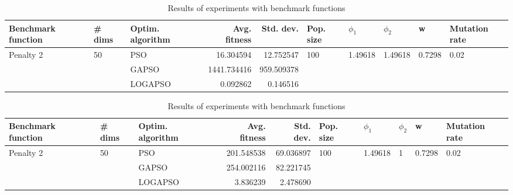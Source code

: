 \documentclass{article}
\begin{document}
\begin{table}
\centering
\caption{Results of experiments with benchmark functions}
\begin{tabular}{lllrrlllll}
\toprule
        Benchmark function &             \# dims & Optim. algorithm &  Avg. fitness &  Std. dev. &            Pop. size &               $\phi_{1}$ &               $\phi_{2}$ &                       w &         Mutation rate \\
\midrule
\multirow{3}{*}{Penalty 2} & \multirow{3}{*}{50} &              PSO &     16.304594 &  12.752547 & \multirow{3}{*}{100} & \multirow{3}{*}{1.49618} & \multirow{3}{*}{1.49618} & \multirow{3}{*}{0.7298} & \multirow{3}{*}{0.02} \\
                           &                     &            GAPSO &   1441.734416 & 959.509378 &                      &                          &                          &                         &                       \\
                           &                     &          LOGAPSO &      0.092862 &   0.146516 &                      &                          &                          &                         &                       \\
\bottomrule
\end{tabular}
\end{table}
\begin{table}
\centering
\caption{Results of experiments with benchmark functions}
\begin{tabular}{lllrrlllll}
\toprule
        Benchmark function &             \# dims & Optim. algorithm &  Avg. fitness &  Std. dev. &            Pop. size &               $\phi_{1}$ &         $\phi_{2}$ &                       w &         Mutation rate \\
\midrule
\multirow{3}{*}{Penalty 2} & \multirow{3}{*}{50} &              PSO &    201.548538 &  69.036897 & \multirow{3}{*}{100} & \multirow{3}{*}{1.49618} & \multirow{3}{*}{1} & \multirow{3}{*}{0.7298} & \multirow{3}{*}{0.02} \\
                           &                     &            GAPSO &    254.002116 &  82.221745 &                      &                          &                    &                         &                       \\
                           &                     &          LOGAPSO &      3.836239 &   2.478690 &                      &                          &                    &                         &                       \\
\bottomrule
\end{tabular}
\end{table}
\end{document}
